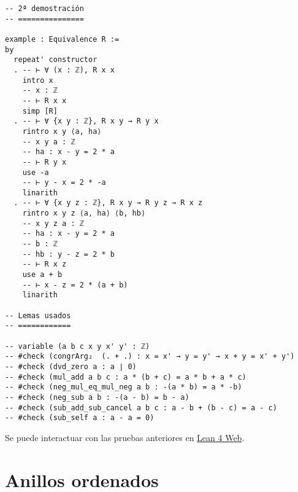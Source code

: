 \begin{verbatim}
-- 2ª demostración
-- ===============

example : Equivalence R :=
by
  repeat' constructor
  . -- ⊢ ∀ (x : ℤ), R x x
    intro x
    -- x : ℤ
    -- ⊢ R x x
    simp [R]
  . -- ⊢ ∀ {x y : ℤ}, R x y → R y x
    rintro x y ⟨a, ha⟩
    -- x y a : ℤ
    -- ha : x - y = 2 * a
    -- ⊢ R y x
    use -a
    -- ⊢ y - x = 2 * -a
    linarith
  . -- ⊢ ∀ {x y z : ℤ}, R x y → R y z → R x z
    rintro x y z ⟨a, ha⟩ ⟨b, hb⟩
    -- x y z a : ℤ
    -- ha : x - y = 2 * a
    -- b : ℤ
    -- hb : y - z = 2 * b
    -- ⊢ R x z
    use a + b
    -- ⊢ x - z = 2 * (a + b)
    linarith

-- Lemas usados
-- ============

-- variable (a b c x y x' y' : ℤ)
-- #check (congrArg₂  (. + .) : x = x' → y = y' → x + y = x' + y')
-- #check (dvd_zero a : a ∣ 0)
-- #check (mul_add a b c : a * (b + c) = a * b + a * c)
-- #check (neg_mul_eq_mul_neg a b : -(a * b) = a * -b)
-- #check (neg_sub a b : -(a - b) = b - a)
-- #check (sub_add_sub_cancel a b c : a - b + (b - c) = a - c)
-- #check (sub_self a : a - a = 0)
\end{verbatim}
Se puede interactuar con las pruebas anteriores en \href{https://lean.math.hhu.de/\#url=https://raw.githubusercontent.com/jaalonso/Calculemus2/main/src/La\_congruencia\_modulo\_2\_es\_una\_relacion\_de\_equivalencia.lean}{Lean 4 Web}.

\chapter{Anillos ordenados}
\label{sec:org04b29fa}

